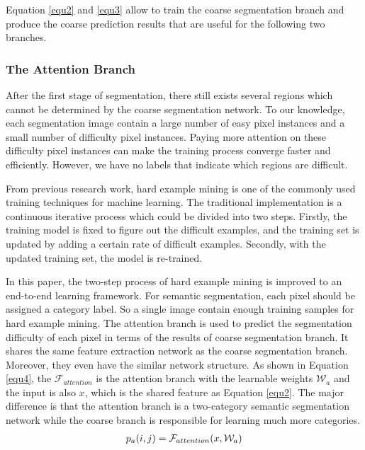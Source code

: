\documentclass[10.5pt,compsoc]{TsT}
\theoremstyle{mystyle}
\begin{document}
{Equation \ref{equ2} and \ref{equ3} allow to train the coarse segmentation branch and produce the coarse prediction results that are useful for the following two branches.


\subsubsection{The Attention Branch}
\label{s:ab}
\noindent

After the first stage of segmentation, there still exists several regions which cannot be determined by the coarse segmentation network. To our knowledge, each segmentation image contain a large number of easy pixel instances and a small number of difficulty pixel instances. Paying more attention on these difficulty pixel instances can make the training process converge faster and efficiently. However, we have no labels that indicate which regions are difficult. 

From previous research work, hard example mining is one of the commonly used training techniques for machine learning. The traditional implementation is a continuous iterative process which could be divided into two steps. Firstly, the training model is fixed to figure out the difficult examples, and the training set is updated by adding a certain rate of difficult examples. Secondly, with the updated training set, the model is re-trained.

In this paper, the two-step process of hard example mining is improved to an end-to-end learning framework. For semantic segmentation, each pixel should be assigned a category label. So a single image contain enough training samples for hard example mining. The attention branch is used to predict the segmentation difficulty of each pixel in terms of the results of coarse segmentation branch. It shares the same feature extraction network as the coarse segmentation branch. Moreover, they even have the similar network structure.  As shown in Equation \ref{equ4}, the $\mathcal{F}_{attention}$ is the attention branch with the learnable weights $ \mathcal{W}_a$ and the input is also $x$, which is the shared feature as Equation \ref{equ2}. The major difference is that the attention branch is a two-category semantic segmentation network while the coarse branch is responsible for learning much more categories.
\begin{equation}\label{equ4}
\setlength\abovedisplayskip{8pt}
\setlength\belowdisplayskip{8pt}
\begin{split}
p_{a}(i,j) &= \mathcal{F}_{attention}(x, \mathcal{W}_a)\\
\end{split}
\end{equation} 

}
\end{document}
